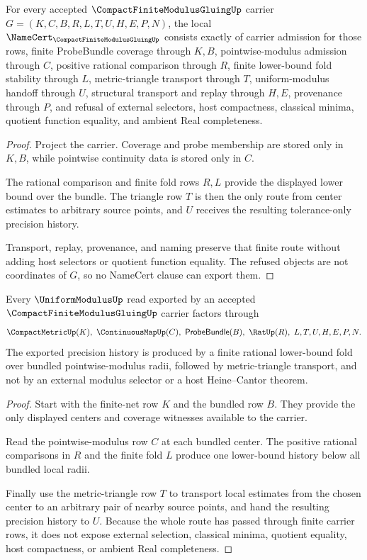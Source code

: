 \begin{theorem}
\label{thm:compact-finite-modulus-gluing-namecert-obligations}
For every accepted $\CompactFiniteModulusGluingUp$ carrier $G=(K,C,B,R,L,T,U,H,E,P,N)$, the local $\NameCert_{\CompactFiniteModulusGluingUp}$ consists exactly of carrier admission for those rows, finite ProbeBundle coverage through $K,B$, pointwise-modulus admission through $C$, positive rational comparison through $R$, finite lower-bound fold stability through $L$, metric-triangle transport through $T$, uniform-modulus handoff through $U$, structural transport and replay through $H,E$, provenance through $P$, and refusal of external selectors, host compactness, classical minima, quotient function equality, and ambient Real completeness.
\end{theorem}
\begin{proof}
Project the carrier. Coverage and probe membership are stored only in $K,B$, while pointwise continuity data is stored only in $C$.

The rational comparison and finite fold rows $R,L$ provide the displayed lower bound over the bundle. The triangle row $T$ is then the only route from center estimates to arbitrary source points, and $U$ receives the resulting tolerance-only precision history.

Transport, replay, provenance, and naming preserve that finite route without adding host selectors or quotient function equality. The refused objects are not coordinates of $G$, so no NameCert clause can export them.
\end{proof}

\begin{theorem}
\label{thm:compact-finite-modulus-gluing-uniform-modulus-route}
Every $\UniformModulusUp$ read exported by an accepted $\CompactFiniteModulusGluingUp$ carrier factors through
$$
\CompactMetricUp(K),\ \ContinuousMapUp(C),\ \mathsf{ProbeBundle}(B),\ \RatUp(R),\ L,T,U,H,E,P,N .
$$
The exported precision history is produced by a finite rational lower-bound fold over bundled pointwise-modulus radii, followed by metric-triangle transport, and not by an external modulus selector or a host Heine--Cantor theorem.
\end{theorem}
\begin{proof}
Start with the finite-net row $K$ and the bundled row $B$. They provide the only displayed centers and coverage witnesses available to the carrier.

Read the pointwise-modulus row $C$ at each bundled center. The positive rational comparisons in $R$ and the finite fold $L$ produce one lower-bound history below all bundled local radii.

Finally use the metric-triangle row $T$ to transport local estimates from the chosen center to an arbitrary pair of nearby source points, and hand the resulting precision history to $U$. Because the whole route has passed through finite carrier rows, it does not expose external selection, classical minima, quotient equality, host compactness, or ambient Real completeness.
\end{proof}

